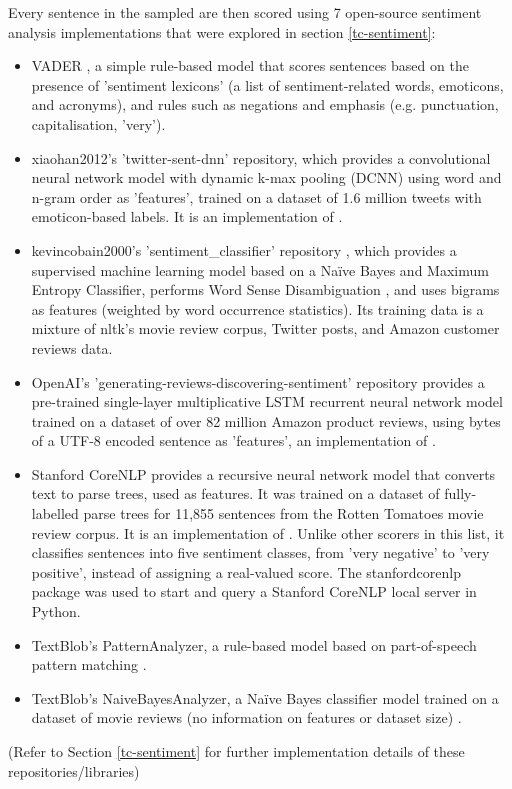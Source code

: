 \documentclass{report}
\begin{document}
Every sentence in the sampled are then scored using 7 open-source sentiment analysis implementations that were explored in section \ref{tc-sentiment}:
\begin{itemize}
	\item VADER \cite{VADER}, a simple rule-based model that scores sentences based on the presence of 'sentiment lexicons' (a list of sentiment-related words, emoticons, and acronyms), and rules such as negations and emphasis (e.g. punctuation, capitalisation, 'very').
	\item xiaohan2012's 'twitter-sent-dnn' repository, which provides a convolutional neural 	network model with dynamic k-max pooling (DCNN) using word and n-gram order as 'features', trained on a dataset of 1.6 million tweets with emoticon-based labels. 
		It is an implementation of \cite{kalchbrennerACL2014}.
	\item kevincobain2000's 'sentiment\_classifier' repository \cite{kevincobain}, which provides a supervised machine learning model based on a Na\"{i}ve Bayes and Maximum Entropy Classifier, performs Word Sense Disambiguation \cite{banerjee2002adapted}, and uses bigrams as features (weighted by word occurrence statistics).
		Its training data is a mixture of nltk's movie review corpus, Twitter posts, and Amazon customer reviews data.
	\item OpenAI's 'generating-reviews-discovering-sentiment' repository provides a pre-trained single-layer multiplicative LSTM recurrent neural network model trained on a dataset of over 82 million Amazon product reviews, using bytes of a UTF-8 encoded sentence as 'features', an implementation of \cite{OpenAI}.
	\item Stanford CoreNLP \cite{StanfordNLP} provides a recursive neural network model that converts text to parse trees, used as features. 
	It was trained on a dataset of fully-labelled parse trees for 11,855 sentences from the Rotten Tomatoes movie review corpus.
	It is an implementation of \cite{socher2013recursive}.
	Unlike other scorers in this list, it classifies sentences into five sentiment classes, from 'very negative' to 'very positive', instead of assigning a real-valued score.
	The stanfordcorenlp package \cite{stanfordcorenlp} was used to start and query a Stanford CoreNLP local server in Python.
	\item TextBlob's PatternAnalyzer, a rule-based model based on part-of-speech pattern matching \cite{textblob}.
	\item TextBlob's NaiveBayesAnalyzer, a Na\"{i}ve Bayes classifier model trained on a dataset of movie reviews (no information on features or dataset size) \cite{textblob}.
\end{itemize}
(Refer to Section \ref{tc-sentiment} for further implementation details of these repositories/libraries)
\end{document}
